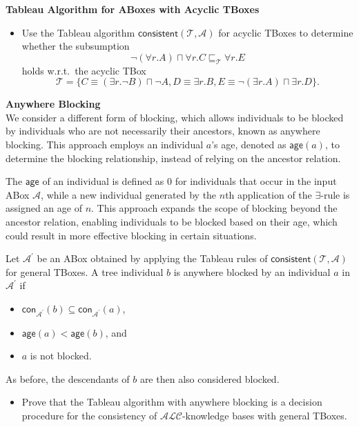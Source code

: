 \documentclass[12pt,a4paper]{article}
\newenvironment{problem}[2][{\color{red}Question}]{\begin{trivlist}
\item[\hskip \labelsep {\bfseries #1}\hskip \labelsep {\bfseries #2.}]}{\end{trivlist}}
\begin{document}
\begin{problem}{{\color{red}6}}
\textbf{Tableau Algorithm for ABoxes with Acyclic TBoxes}
\begin{itemize}
\item[-] Use the Tableau algorithm $\textsf{consistent}(\mathcal{T},\mathcal{A})$ for acyclic TBoxes to determine whether the subsumption
\[\neg(\forall r.A)\sqcap\forall r.C\sqsubseteq_{\mathcal{T}}\forall r.E\]holds w.r.t.\ the acyclic TBox
\[\mathcal{T}=\{C\equiv(\exists r.\neg B)\sqcap\neg A, D\equiv\exists r.B, E\equiv\neg(\exists r.A)\sqcap\exists r.D\}.\]
\end{itemize}
\end{problem}


\begin{problem}{{\color{red}7}}
\textbf{Anywhere Blocking}\\
We consider a different form of blocking, which allows individuals to be blocked by individuals who are not necessarily their ancestors, known as anywhere blocking. This approach employs an individual $a$'s age, denoted as $\textsf{age}(a)$, to determine the blocking relationship, instead of relying on the ancestor relation.

The $\textsf{age}$ of an individual is defined as $0$ for individuals that occur in the input ABox $\mathcal{A}$, while a new individual generated by the $n$th application of the $\exists$-rule is assigned an age of $n$. This approach expands the scope of blocking beyond the ancestor relation, enabling individuals to be blocked based on their age, which could result in more effective blocking in certain situations.

Let $\mathcal{A}^{\prime}$ be an ABox obtained by applying the Tableau rules of $\textsf{consistent}(\mathcal{T}, \mathcal{A})$ for general TBoxes. A tree individual $b$ is anywhere blocked by an individual $a$ in $\mathcal{A}^{\prime}$ if
\begin{itemize}
\item[$\bullet$] $\textsf{con}_{\mathcal{A}^{\prime}}(b)\subseteq\textsf{con}_{\mathcal{A}^{\prime}}(a)$,
\item[$\bullet$] $\textsf{age}(a)<\textsf{age}(b)$, and
\item[$\bullet$] $a$ is not blocked.
\end{itemize}
As before, the descendants of $b$ are then also considered blocked.
\begin{itemize}
\item[-] Prove that the Tableau algorithm with anywhere blocking is a decision procedure for the consistency of $\mathcal{ALC}$-knowledge bases with general TBoxes. 
\end{itemize}
\end{problem}
\end{document}
